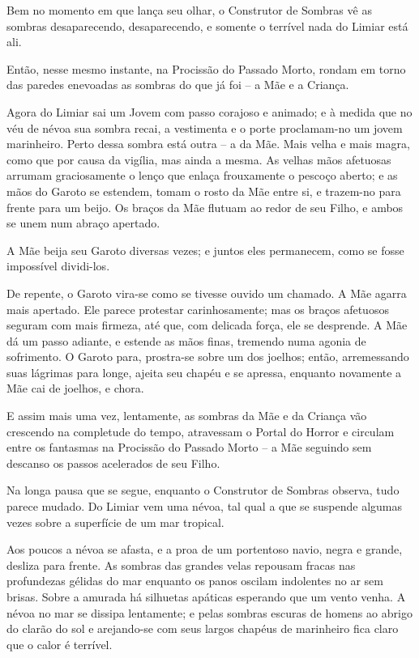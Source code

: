 Bem no momento em que lança seu olhar, o Construtor de Sombras vê as
sombras desaparecendo, desaparecendo, e somente o terrível nada do
Limiar está ali.

Então, nesse mesmo instante, na Procissão do Passado Morto, rondam em
torno das paredes enevoadas as sombras do que já foi -- a Mãe e a
Criança.

\smallskip
Agora do Limiar sai um Jovem com passo corajoso e animado; e à medida
que no véu de névoa sua sombra recai, a vestimenta e o porte
proclamam-no um jovem marinheiro. Perto dessa sombra está outra -- a da
Mãe. Mais velha e mais magra, como que por causa da vigília, mas ainda a
mesma. As velhas mãos afetuosas arrumam graciosamente o lenço que enlaça
frouxamente o pescoço aberto; e as mãos do Garoto se estendem, tomam o
rosto da Mãe entre si, e trazem-no para frente para um beijo. Os braços
da Mãe flutuam ao redor de seu Filho, e ambos se unem num abraço
apertado.

A Mãe beija seu Garoto diversas vezes; e juntos eles permanecem, como se
fosse impossível dividi-los.

De repente, o Garoto vira-se como se tivesse ouvido um chamado. A Mãe
agarra mais apertado. Ele parece protestar carinhosamente; mas os braços
afetuosos seguram com mais firmeza, até que, com delicada força, ele se
desprende. A Mãe dá um passo adiante, e estende as mãos finas, tremendo
numa agonia de sofrimento. O Garoto para, prostra-se sobre um dos
joelhos; então, arremessando suas lágrimas para longe, ajeita seu chapéu
e se apressa, enquanto novamente a Mãe cai de joelhos, e chora.

E assim mais uma vez, lentamente, as sombras da Mãe e da Criança vão
crescendo na completude do tempo, atravessam o Portal do Horror e
circulam entre os fantasmas na Procissão do Passado Morto -- a Mãe
seguindo sem descanso os passos acelerados de seu Filho.

\smallskip
Na longa pausa que se segue, enquanto o Construtor de Sombras observa,
tudo parece mudado. Do Limiar vem uma névoa, tal qual a que se suspende
algumas vezes sobre a superfície de um mar tropical.

Aos poucos a névoa se afasta, e a proa de um portentoso navio, negra e
grande, desliza para frente. As sombras das grandes velas repousam
fracas nas profundezas gélidas do mar enquanto os panos oscilam
indolentes no ar sem brisas. Sobre a amurada há silhuetas apáticas
esperando que um vento venha. A névoa no mar se dissipa lentamente; e
pelas sombras escuras de homens ao abrigo do clarão do sol e arejando-se
com seus largos chapéus de marinheiro fica claro que o calor é terrível.

